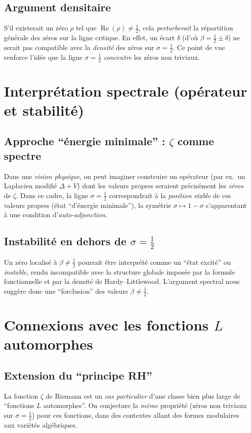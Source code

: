 \documentclass[11pt]{article}
\begin{document}
\subsection{Argument densitaire}
S'il existerait un zéro \(\rho\) tel que \(\operatorname{Re}(\rho)\neq \tfrac12\), cela \emph{perturberait} la répartition générale des zéros sur la ligne critique. En effet, un écart \(\delta\) (d'où \(\beta = \tfrac12 \pm \delta\)) ne serait pas compatible avec la \emph{densité} des zéros sur \(\sigma=\tfrac12\). Ce point de vue renforce l'idée que la ligne \(\sigma=\tfrac12\) \emph{concentre} les zéros non triviaux.

\section{Interprétation spectrale (opérateur et stabilité)}
\label{sec:spectrale}

\subsection{Approche “énergie minimale” : \(\zeta\) comme spectre}
Dans une \emph{vision physique}, on peut imaginer construire un opérateur (par ex.\ un Laplacien modifié \(\Delta + V\)) dont les valeurs propres seraient précisément les \emph{zéros} de \(\zeta\). Dans ce cadre, la ligne \(\sigma=\tfrac12\) correspondrait à la \emph{position stable} de ces valeurs propres (état ``d'énergie minimale''), la symétrie \(\sigma \mapsto 1-\sigma\) s'apparentant à une condition d'\emph{auto-adjonction}.

\subsection{Instabilité en dehors de \(\sigma=\tfrac12\)}
Un zéro localisé à \(\beta \neq \tfrac12\) pourrait être interprété comme un ``état excité'' ou \emph{instable}, rendu incompatible avec la structure globale imposée par la formule fonctionnelle et par la densité de Hardy--Littlewood. L'argument spectral nous suggère donc une ``forclusion'' des valeurs \(\beta \neq \tfrac12\).

\section{Connexions avec les fonctions $L$ automorphes}
\label{sec:fonctions_L}

\subsection{Extension du “principe RH”}
La fonction \(\zeta\) de Riemann est un \emph{cas particulier} d'une classe bien plus large de ``fonctions $L$ automorphes''. On conjecture la \emph{même} propriété (zéros non triviaux sur \(\sigma=\tfrac12\)) pour ces fonctions, dans des contextes allant des formes modulaires aux variétés algébriques.
\end{document}

